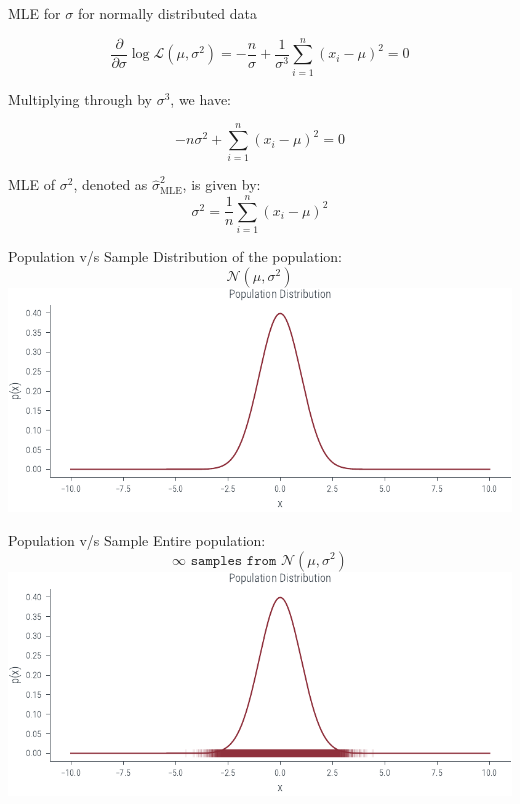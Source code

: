 \documentclass[handout]{beamer}
\begin{document}
\begin{frame}{MLE for $\sigma$ for normally distributed data}

    
        \[
        \frac{{\partial}}{{\partial \sigma}} \log \mathcal{L}(\mu, \sigma^2) = -\frac{n}{\sigma} + \frac{1}{\sigma^3} \sum_{i=1}^n (x_i-\mu)^2 = 0
        \]
    
        Multiplying through by $\sigma^3$, we have:
    
        \[
        -n \sigma^2 + \sum_{i=1}^n (x_i-\mu)^2 = 0
        \]
    
        \begin{tcolorbox}[colback=metropolisblue!5,colframe=metropolisblue,title=Maximum Likelihood Estimate for $\sigma^2$]
            MLE of $\sigma^2$, denoted as $\hat{\sigma}^2_{\text{MLE}}$, is given by:
            \[
                \sigma^2 = \frac{1}{n} \sum_{i=1}^n (x_i-\mu)^2
                \]
        \end{tcolorbox}
    
       

    \end{frame}

    \begin{frame}{Population v/s Sample}
        Distribution of the population:
        $$\mathcal{N}(\mu, \sigma^2)$$
        \includegraphics[width=\textwidth]{../figures/mle/population-dist.pdf}
        
    \end{frame}

    \begin{frame}{Population v/s Sample}
        Entire population:
        $$\infty \texttt{ samples from } \mathcal{N}(\mu, \sigma^2)$$
        \includegraphics[width=\textwidth]{../figures/mle/population.pdf}
        
    \end{frame}
\end{document}
